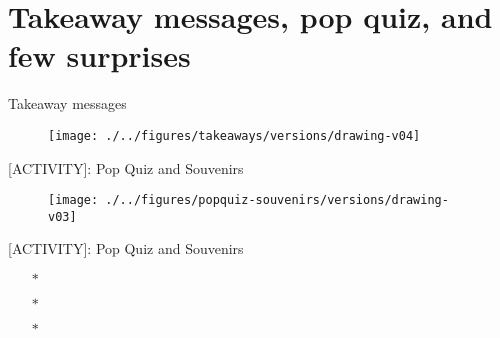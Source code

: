 \section{Takeaway messages, pop quiz, and few surprises}



{
\begin{frame}{Takeaway messages}
  \begin{figure}
  \centering
  \texttt{[image: ./../figures/takeaways/versions/drawing-v04]}
  \end{figure}

\end{frame}
}

{
\begin{frame}{[\faUsers ACTIVITY]: Pop Quiz and Souvenirs}
  \begin{figure}
  \centering
  \texttt{[image: ./../figures/popquiz-souvenirs/versions/drawing-v03]}
  \end{figure}

\end{frame}
}


{
\begin{frame}{[\faUsers ACTIVITY]: Pop Quiz and Souvenirs}

  \bigSizeFont
  \begin{itemize}
  \setlength\itemsep{1em}
    \item[$\ast$] \color{subtitle}{Q1. What is the most common imaging technique to see a fetus in a mother’s womb?}
    \item[$\ast$] \color{subtitle}{Q2. Can you name the person's job who performs  the imaging of fetus?}
    \item[$\ast$] \color{subtitle}{Q3. Can you name one of the other imaging techniques to diagnose and to monitor fetus in a mother’s womb?}
  \end{itemize}

\end{frame}
}


